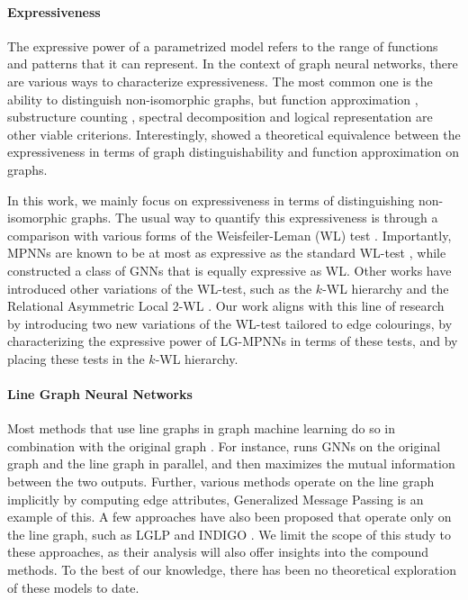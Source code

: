 \documentclass{article}
\begin{document}
\paragraph{Expressiveness}
The expressive power of a parametrized model refers to the range of functions and patterns that it can represent. 
In the context of graph neural networks, there are various ways to characterize expressiveness. The most common one is the ability to distinguish non-isomorphic graphs, but function approximation \cite{maron2019universality}, substructure counting \cite{chen2020can}, spectral decomposition \cite{balcilar2020analyzing} and logical representation \cite{barcelo2020logical} are other viable criterions. Interestingly, \cite{chen2019equivalence} showed a theoretical equivalence between the expressiveness in terms of graph distinguishability and function approximation on graphs.

In this work, we mainly focus on expressiveness in terms of distinguishing non-isomorphic graphs.
The usual way to quantify this expressiveness is through a comparison with various forms of the Weisfeiler-Leman (WL) test \cite{weisfeiler1968reduction}. Importantly, MPNNs are known to be at most as expressive as the standard WL-test \cite{morris2019weisfeiler}, while \cite{xu2018powerful} constructed a class of GNNs that is equally expressive as WL. Other works have introduced other variations of the WL-test, such as the $k$-WL hierarchy \cite{morris2019weisfeiler} and the Relational Asymmetric Local 2-WL \cite{huang2024theory}.
Our work aligns with this line of research by introducing two new variations of the WL-test tailored to edge colourings, by characterizing the expressive power of LG-MPNNs in terms of these tests, and by placing these tests in the $k$-WL hierarchy.



\paragraph{Line Graph Neural Networks}
Most methods that use line graphs in graph machine learning do so in combination with the original graph \cite{choudhary2021atomistic,chen2017supervised,jiang2019censnet,zhang2023line}. For instance, \cite{zhang2023line} runs GNNs on the original graph and the line graph in parallel, and then maximizes the mutual information between the two outputs.
Further, various methods operate on the line graph implicitly by computing edge attributes, 
Generalized Message Passing \cite{battaglia2018relational} is an example of this.
A few approaches have also been proposed that operate only on the line graph, such as LGLP \cite{cai2021line} and INDIGO \cite{liu2021indigo}.
We limit the scope of this study to these approaches, as their analysis will also offer insights into the compound methods. To the best of our knowledge, there has been no theoretical exploration of these models to date.
\end{document}
